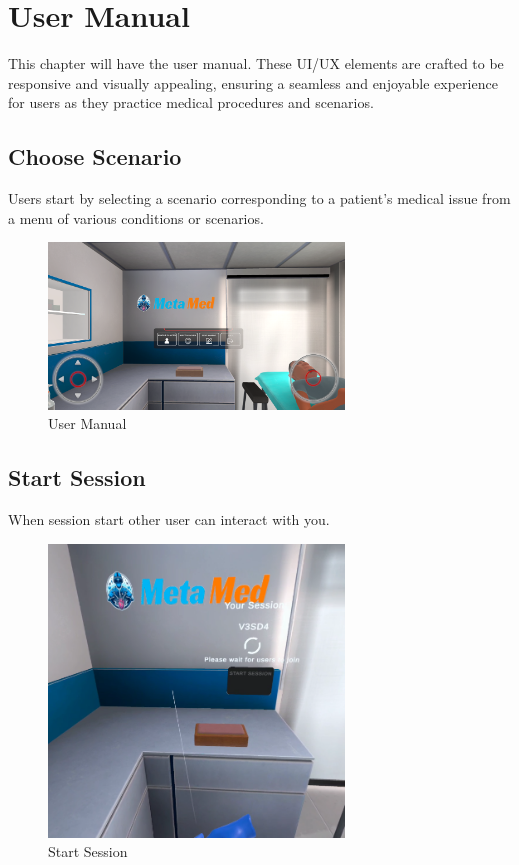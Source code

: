 \chapter{User Manual}
\label{ch:manual}
This chapter will have the user manual. These UI/UX elements are crafted to be responsive and visually appealing, ensuring a seamless and enjoyable experience for users as they practice medical procedures and scenarios.
\section{Choose Scenario}
Users start by selecting a scenario corresponding to a patient's medical issue from a menu of various conditions or scenarios.
\begin{figure}[h]
    \centering
    \includegraphics[width=0.7\textwidth, height=0.3\textheight]{Images/User Manual.png}
    \caption{User Manual}
    \label{fig:User Manual}
\end{figure}

\section{Start Session}
When session start other user can interact with you.
\begin{figure}[h]
	\centering
	\includegraphics[width=0.7\textwidth, height=0.3\textheight]{Images/start session.png}
	\caption{Start Session}
	\label{fig:Start Session}
\end{figure}

